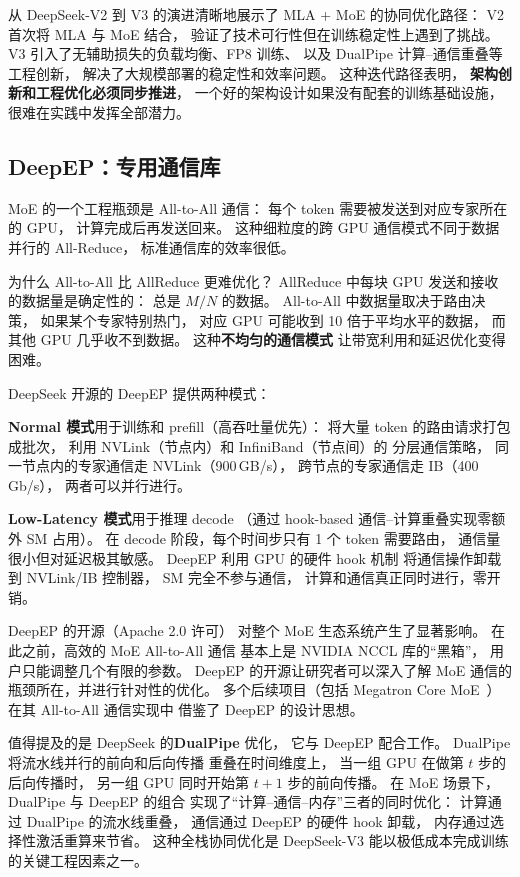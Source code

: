 从 DeepSeek-V2 到 V3 的演进清晰地展示了
MLA + MoE 的协同优化路径：
V2 首次将 MLA 与 MoE 结合，
验证了技术可行性但在训练稳定性上遇到了挑战。
V3 引入了无辅助损失的负载均衡、FP8 训练、
以及 DualPipe 计算--通信重叠等工程创新，
解决了大规模部署的稳定性和效率问题。
这种迭代路径表明，
\textbf{架构创新和工程优化必须同步推进}，
一个好的架构设计如果没有配套的训练基础设施，
很难在实践中发挥全部潜力。

\subsection{DeepEP：专用通信库}

MoE 的一个工程瓶颈是 All-to-All 通信：
每个 token 需要被发送到对应专家所在的 GPU，
计算完成后再发送回来。
这种细粒度的跨 GPU 通信模式不同于数据并行的 All-Reduce，
标准通信库的效率很低。

为什么 All-to-All 比 AllReduce 更难优化？
AllReduce 中每块 GPU 发送和接收的数据量是确定性的：
总是 $M/N$ 的数据。
All-to-All 中数据量取决于路由决策，
如果某个专家特别热门，
对应 GPU 可能收到 10 倍于平均水平的数据，
而其他 GPU 几乎收不到数据。
这种\textbf{不均匀的通信模式}
让带宽利用和延迟优化变得困难。

DeepSeek 开源的 DeepEP 提供两种模式：

\textbf{Normal 模式}用于训练和 prefill（高吞吐量优先）：
将大量 token 的路由请求打包成批次，
利用 NVLink（节点内）和 InfiniBand（节点间）的
分层通信策略，
同一节点内的专家通信走 NVLink（900\,GB/s），
跨节点的专家通信走 IB（400\,Gb/s），
两者可以并行进行。

\textbf{Low-Latency 模式}用于推理 decode
（通过 hook-based 通信--计算重叠实现零额外 SM 占用）。
在 decode 阶段，每个时间步只有 1 个 token 需要路由，
通信量很小但对延迟极其敏感。
DeepEP 利用 GPU 的硬件 hook 机制
将通信操作卸载到 NVLink/IB 控制器，
SM 完全不参与通信，
计算和通信真正同时进行，零开销。

DeepEP 的开源（Apache 2.0 许可）
对整个 MoE 生态系统产生了显著影响。
在此之前，高效的 MoE All-to-All 通信
基本上是 NVIDIA NCCL 库的“黑箱”，
用户只能调整几个有限的参数。
DeepEP 的开源让研究者可以深入了解
MoE 通信的瓶颈所在，并进行针对性的优化。
多个后续项目（包括 Megatron Core MoE~\cite{yan2026megatronmoe}）
在其 All-to-All 通信实现中
借鉴了 DeepEP 的设计思想。

值得提及的是 DeepSeek 的\textbf{DualPipe} 优化，
它与 DeepEP 配合工作。
DualPipe 将流水线并行的前向和后向传播
重叠在时间维度上，
当一组 GPU 在做第 $t$ 步的后向传播时，
另一组 GPU 同时开始第 $t+1$ 步的前向传播。
在 MoE 场景下，DualPipe 与 DeepEP 的组合
实现了“计算--通信--内存”三者的同时优化：
计算通过 DualPipe 的流水线重叠，
通信通过 DeepEP 的硬件 hook 卸载，
内存通过选择性激活重算来节省。
这种全栈协同优化是 DeepSeek-V3
能以极低成本完成训练的关键工程因素之一。

